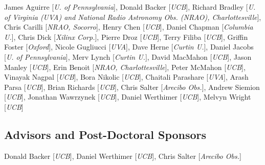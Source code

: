 \documentclass[apjpt4]{aastex}
\begin{document}
James Aguirre [{\it U. of Pennsylvania}],
Donald Backer [{\it UCB}],
Richard Bradley [{\it U. of Virginia (UVA) and National Radio Astronomy Obs. (NRAO), Charlottesville}],
Chris Carilli [{\it NRAO, Socorro}],
Henry Chen [{\it UCB}],
Daniel Chapman [{\it Columbia U.}],
Chris Dick [{\it Xilinx Corp.}],
Pierre Droz [{\it UCB}],
Terry Filiba [{\it UCB}],
Griffin Foster [{\it Oxford}],
Nicole Gugliucci [{\it UVA}],
Dave Herne [{\it Curtin U.}],
Daniel Jacobs [{\it U. of Pennsylvania}],
Merv Lynch [{\it Curtin U.}],
David MacMahon [{\it UCB}],
Jason Manley [{\it UCB}],
Erin Benoit [{\it NRAO, Charlottesville}],
Peter McMahon [{\it UCB}],
Vinayak Nagpal [{\it UCB}],
Bora Nikolic [{\it UCB}],
Chaitali Parashare [{\it UVA}],
Arash Parsa [{\it UCB}],
Brian Richards [{\it UCB}],
Chris Salter [{\it Arecibo Obs.}],
Andrew Siemion [{\it UCB}],
Jonathan Wawrzynek [{\it UCB}],
Daniel Werthimer [{\it UCB}],
Melvyn Wright [{\it UCB}]

\subsection*{Advisors and Post-Doctoral Sponsors}
\vspace{-8pt}

Donald Backer [{\it UCB}],
Daniel Werthimer [{\it UCB}],
Chris Salter [{\it Arecibo Obs.}]
\end{document}
